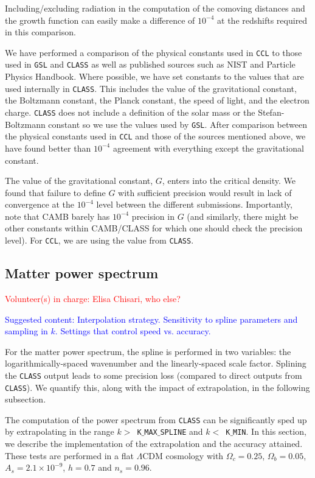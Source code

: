 \documentclass[\docopts]{\docclass}
\newcommand{\vol}[1]{\textcolor{red}{Volunteer(s) in charge: #1}}
\newcommand{\cont}[1]{\textcolor{blue}{Suggested content: #1}}
\newcommand{\ccl}{{\tt CCL}\xspace}
\begin{document}
Including/excluding radiation in the computation of the comoving distances and the growth function can easily make a difference of $10^{-4}$ at the redshifts required in this comparison.

We have performed a comparison of the physical constants used in \ccl to those used in {\tt GSL} and {\tt CLASS} as well as published sources such as NIST and Particle Physics Handbook. Where possible, we have set constants to the values that are used internally in {\tt CLASS}. This includes the value of the gravitational constant, the Boltzmann constant, the Planck constant, the speed of light, and the electron charge. {\tt CLASS} does not include a definition of the solar mass or the Stefan-Boltzmann constant so we use the values used by {\tt GSL}. After comparison between the physical constants used in \ccl and those of the sources mentioned above, we have found better than $10^{-4}$ agreement with everything except the gravitational constant.

The value of the gravitational constant, $G$, enters into the critical density. We found that failure to define $G$ with sufficient precision would result in lack of convergence at the $10^{-4}$ level between the different submissions. Importantly, note that CAMB barely has $10^{-4}$ precision in $G$ (and similarly, there might be other constants within CAMB/CLASS for which one should check the precision level). For \ccl, we are using the value from {\tt CLASS}.

\subsection{Matter power spectrum}
\vol{Elisa Chisari, who else?}

\cont{Interpolation strategy. Sensitivity to spline parameters and sampling in $k$. Settings that control speed vs. accuracy. }

For the matter power spectrum, the spline is performed in two variables: the logarithmically-spaced wavenumber and the linearly-spaced scale factor. Splining the {\tt CLASS} output leads to some precision loss (compared to direct outputs from {\tt CLASS}). We quantify this, along with the impact of extrapolation, in the following subsection.

The computation of the power spectrum from {\tt CLASS} can be significantly sped up by extrapolating in the range $k>$~{\tt K$\_$MAX$\_$SPLINE} and $k<$~{\tt K$\_$MIN}. In this section, we describe the implementation of the extrapolation and the accuracy attained. These tests are performed in a flat $\Lambda$CDM cosmology with $\Omega_c=0.25$, $\Omega_b=0.05$, $A_s=2.1\times10^{-9}$, $h=0.7$ and $n_s=0.96$.
\end{document}
